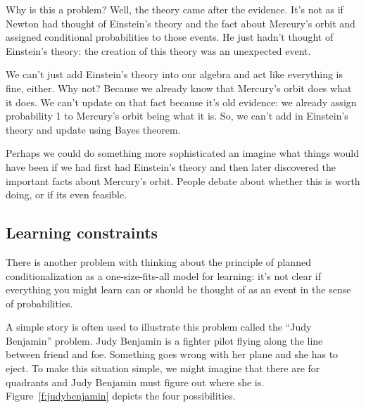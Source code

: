 Why is this a problem? Well, the theory came after the evidence. It's not as if Newton had thought of Einstein's theory and the fact about Mercury's orbit and assigned conditional probabilities to those events.  He just hadn't thought of Einstein's theory: the creation of this theory was an unexpected event.

We can't just add Einstein's theory into our algebra and act like everything is fine, either.  Why not?  Because we already know that Mercury's orbit does what it does.  We can't update on that fact because it's old evidence: we already assign probability 1 to Mercury's orbit being what it is.  So, we can't add in Einstein's theory and update using Bayes theorem.

Perhaps we could do something more sophisticated an imagine what things would have been if we had first had Einstein's theory and then later discovered the important facts about Mercury's orbit. People debate about whether this is worth doing, or if its even feasible.

\subsection{Learning constraints}

There is another problem with thinking about the principle of planned conditionalization as a one-size-fits-all model for learning: it's not clear if everything you might learn can or should be thought of as an event in the sense of probabilities.  

A simple story is often used to illustrate this problem called the ``Judy Benjamin'' problem.  Judy Benjamin is a fighter pilot flying along the line between friend and foe. Something goes wrong with her plane and she has to eject. To make this situation simple, we might imagine that there are for quadrants and Judy Benjamin must figure out where she is.  Figure~\ref{f:judybenjamin} depicts the four possibilities.

